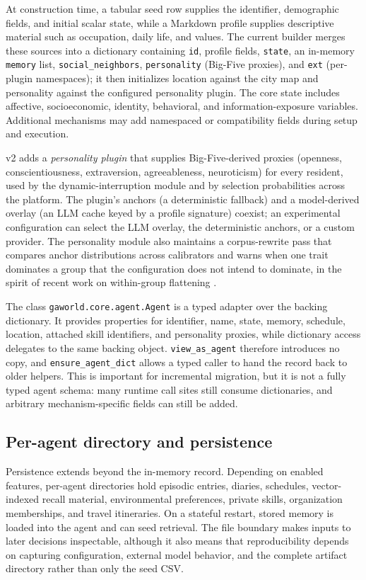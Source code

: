 At construction time, a tabular seed row supplies the identifier, demographic
fields, and initial scalar state, while a Markdown profile supplies descriptive
material such as occupation, daily life, and values.  The current builder
merges these sources into a dictionary containing \texttt{id}, profile fields,
\texttt{state}, an in-memory \texttt{memory} list, \texttt{social\_neighbors},
\texttt{personality} (Big-Five proxies), and \texttt{ext} (per-plugin
namespaces); it then initializes location against the city map and
personality against the configured personality plugin.  The core state includes
affective, socioeconomic, identity, behavioral, and information-exposure
variables.  Additional mechanisms may add namespaced or compatibility fields
during setup and execution.

v2 adds a \emph{personality plugin} that supplies Big-Five-derived proxies
(openness, conscientiousness, extraversion, agreeableness, neuroticism) for
every resident, used by the dynamic-interruption module and by selection
probabilities across the platform.  The plugin's anchors (a deterministic
fallback) and a model-derived overlay (an LLM cache keyed by a profile
signature) coexist; an experimental configuration can select the LLM overlay,
the deterministic anchors, or a custom provider.  The personality module also
maintains a corpus-rewrite pass that compares anchor distributions across
calibrators and warns when one trait dominates a group that the
configuration does not intend to dominate, in the spirit of recent work on
within-group flattening \citep{wang2025flatten}.

The class \texttt{gaworld.core.agent.Agent} is a typed adapter over the
backing dictionary.  It provides properties for identifier, name, state,
memory, schedule, location, attached skill identifiers, and personality
proxies, while dictionary access delegates to the same backing object.
\texttt{view\_as\_agent} therefore introduces no copy, and
\texttt{ensure\_agent\_dict} allows a typed caller to hand the record back to
older helpers.  This is important for incremental migration, but it is not a
fully typed agent schema: many runtime call sites still consume dictionaries,
and arbitrary mechanism-specific fields can still be added.

\subsection{Per-agent directory and persistence}

Persistence extends beyond the in-memory record.  Depending on enabled
features, per-agent directories hold episodic entries, diaries, schedules,
vector-indexed recall material, environmental preferences, private skills,
organization memberships, and travel itineraries.  On a stateful restart,
stored memory is loaded into the agent and can seed retrieval.  The file
boundary makes inputs to later decisions inspectable, although it also means
that reproducibility depends on capturing configuration, external model
behavior, and the complete artifact directory rather than only the seed CSV.

